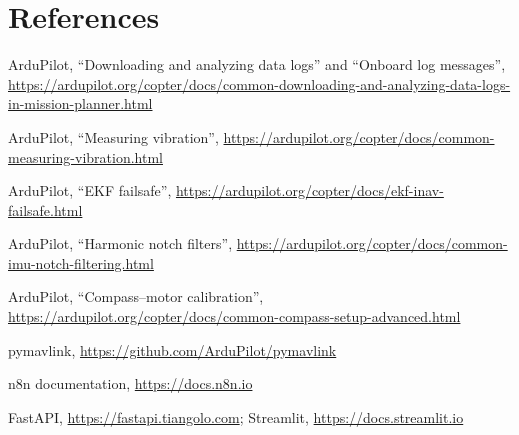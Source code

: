\documentclass[11pt,a4paper]{article}
\begin{document}
\section*{References}
\begin{enumerate}[label={[\arabic*]}]
  \item ArduPilot, ``Downloading and analyzing data logs'' and ``Onboard log messages'', \url{https://ardupilot.org/copter/docs/common-downloading-and-analyzing-data-logs-in-mission-planner.html}
  \item ArduPilot, ``Measuring vibration'', \url{https://ardupilot.org/copter/docs/common-measuring-vibration.html}
  \item ArduPilot, ``EKF failsafe'', \url{https://ardupilot.org/copter/docs/ekf-inav-failsafe.html}
  \item ArduPilot, ``Harmonic notch filters'', \url{https://ardupilot.org/copter/docs/common-imu-notch-filtering.html}
  \item ArduPilot, ``Compass--motor calibration'', \url{https://ardupilot.org/copter/docs/common-compass-setup-advanced.html}
  \item pymavlink, \url{https://github.com/ArduPilot/pymavlink}
  \item n8n documentation, \url{https://docs.n8n.io}
  \item FastAPI, \url{https://fastapi.tiangolo.com}; Streamlit, \url{https://docs.streamlit.io}
\end{enumerate}
\end{document}
